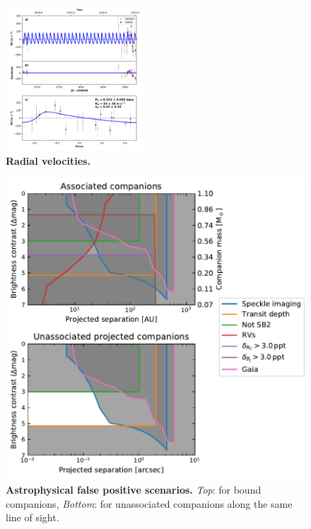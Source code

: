 \documentclass[12pt,twocolumn,tighten]{aastex62}
\begin{document}
\begin{figure}[t!]
	\begin{center}
		\leavevmode
		\includegraphics[width=0.47\textwidth]{f3.pdf}
	\end{center}
	\vspace{-0.7cm}
	\caption{
		{\bf Radial velocities.}
		\label{fig:rvs}
	}
\end{figure}

\begin{figure}[t!]
	\begin{center}
		\leavevmode
		\includegraphics[width=1\textwidth]{f4.pdf}
	\end{center}
	\vspace{-0.7cm}
	\caption{
		{\bf Astrophysical false positive scenarios.}
		{\it Top}: for bound companions,
		{\it Bottom}: for unassociated companions along the same line of
		sight.
		\label{fig:fpscenario}
	}
\end{figure}
\end{document}
